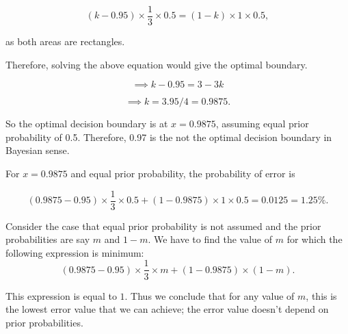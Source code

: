 \documentclass{article}
\begin{document}
$$
(k-0.95)\times\frac{1}{3} \times 0.5 = (1-k)\times1 \times 0.5,
$$

as both areas are rectangles. 

Therefore, solving the above equation would give the optimal boundary.

$$
\implies k - 0.95 = 3-3k
$$

$$
\implies k = 3.95/4 = 0.9875.
$$

So the optimal decision boundary is at $x = 0.9875$, assuming equal prior probability of 0.5. Therefore, 0.97 is the not the optimal decision boundary in Bayesian sense.

For $x=0.9875$ and equal prior probability, the probability of error is 

$$
(0.9875-0.95)\times\frac{1}{3} \times 0.5 + (1-0.9875)\times1 \times 0.5 = 0.0125 = 1.25\%.
$$

Consider the case that equal prior probability is not assumed and the prior probabilities are say $m$ and $1-m$. We have to find the value of $m$ for which the following expression is minimum:
$$
(0.9875-0.95)\times \frac{1}{3} \times m + (1-0.9875) \times (1-m).
$$

This expression is equal to $1$. Thus we conclude that for any value of $m$, this is the lowest error value that we can achieve; the error value doesn't depend on prior probabilities.


%
%
%
%
%
%
%
%
%
\end{document}
